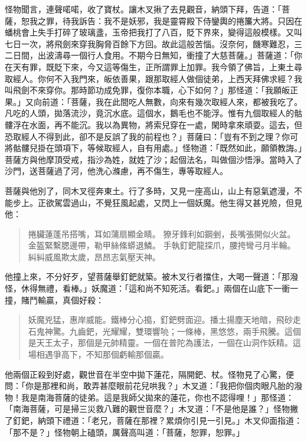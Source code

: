 怪物聞言，連聲喏喏，收了寶杖。讓木叉揪了去見觀音，納頭下拜，告道：「菩薩，恕我之罪，待我訴告：我不是妖邪，我是靈霄殿下侍鑾輿的捲簾大將。只因在蟠桃會上失手打碎了玻璃盞，玉帝把我打了八百，貶下界來，變得這般模樣。又叫七日一次，將飛劍來穿我胸脅百餘下方回。故此這般苦惱。沒奈何，饑寒難忍，三二日間，出波濤尋一個行人食用。不期今日無知，衝撞了大慈菩薩。」菩薩道：「你在天有罪，既貶下來，今又這等傷生，正所謂罪上加罪。我今領了佛旨，上東土尋取經人。你何不入我門來，皈依善果，跟那取經人做個徒弟，上西天拜佛求經？我叫飛劍不來穿你。那時節功成免罪，復你本職，心下如何？」那怪道：「我願皈正果。」又向前道：「菩薩，我在此間吃人無數，向來有幾次取經人來，都被我吃了。凡吃的人頭，拋落流沙，竟沉水底。這個水，鵝毛也不能浮。惟有九個取經人的骷髏浮在水面，再不能沉。我以為異物，將索兒穿在一處，閑時拿來頑耍。這去，但恐取經人不得到此，卻不是反誤了我的前程也？」菩薩曰：「豈有不到之理？你可將骷髏兒掛在頭項下，等候取經人，自有用處。」怪物道：「既然如此，願領教誨。」菩薩方與他摩頂受戒，指沙為姓，就姓了沙；起個法名，叫做個沙悟淨。當時入了沙門，送菩薩過了河，他洗心滌慮，再不傷生，專等取經人。

菩薩與他別了，同木叉徑奔東土。行了多時，又見一座高山，山上有惡氣遮漫，不能步上。正欲駕雲過山，不覺狂風起處，又閃上一個妖魔。他生得又甚兇險，但見他：
\begin{quote}
捲臟蓮蓬吊搭嘴，耳如蒲扇顯金睛。
獠牙鋒利如鋼剉，長嘴張開似火盆。
金盔緊繫腮邊帶，勒甲絲絛蟒退鱗。
手執釘鈀龍探爪，腰挎彎弓月半輪。
糾糾威風欺太歲，昂昂志氣壓天神。
\end{quote}

他撞上來，不分好歹，望菩薩舉釘鈀就築。被木叉行者擋住，大喝一聲道：「那潑怪，休得無禮，看棒。」妖魔道：「這和尚不知死活。看鈀。」兩個在山底下一衝一撞，賭鬥輸贏，真個好殺：
\begin{quote}
妖魔兇猛，惠岸威能。鐵棒分心搗，釘鈀劈面迎。播土揚塵天地暗，飛砂走石鬼神驚。九齒鈀，光耀耀，雙環響喨；一條棒，黑悠悠，兩手飛騰。這個是天王太子，那個是元帥精靈。一個在普陀為護法，一個在山洞作妖精。這場相遇爭高下，不知那個虧輸那個贏。
\end{quote}

他兩個正殺到好處，觀世音在半空中拋下蓮花，隔開鈀、杖。怪物見了心驚，便問：「你是那裡和尚，敢弄甚麼眼前花兒哄我？」木叉道：「我把你個肉眼凡胎的潑物！我是南海菩薩的徒弟。這是我師父拋來的蓮花，你也不認得哩！」那怪道：「南海菩薩，可是掃三災救八難的觀世音麼？」木叉道：「不是他是誰？」怪物撇了釘鈀，納頭下禮道：「老兄，菩薩在那裡？累煩你引見一引見。」木叉仰面指道：「那不是？」怪物朝上磕頭，厲聲高叫道：「菩薩，恕罪，恕罪。」

